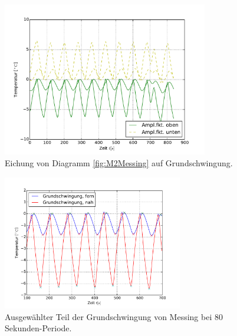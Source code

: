 \begin{figure}[h!]
	\centering
	\includegraphics[width=0.8\textwidth]{Bilder/Normierungsauswahl/M2_Messing_norm.pdf}
	\caption{Eichung von Diagramm \ref{fig:M2Messing} auf Grundschwingung.}
	\label{fig:M2MessingNorm}
\end{figure}
\begin{figure}[h!]
	\centering
	\includegraphics[width=0.7\textwidth]{Bilder/M2_Messing_norm.pdf}
	\caption{Ausgewählter Teil der Grundschwingung von Messing bei 80 Sekunden-Periode.}
	\label{fig:M2MessingNormkurve}
\end{figure}
